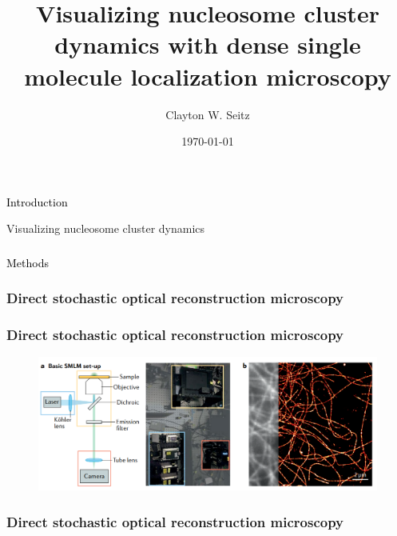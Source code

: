 \documentclass{beamer}					%
\title{Visualizing nucleosome cluster dynamics with dense single molecule localization microscopy}	%
\author{Clayton W. Seitz}								%
\date{\today}									%
\begin{document}
\begin{frame}
  \titlepage
\end{frame}


%


\begin{frame}
\frametitle{}
\centering
\Large \textcolor{black}{Introduction}
\end{frame}

\begin{frame}{Visualizing nucleosome cluster dynamics}

\end{frame}


\begin{frame}
\frametitle{}
\centering
\Large \textcolor{black}{Methods}
\end{frame}



\begin{frame}
\frametitle{Direct stochastic optical reconstruction microscopy}

\end{frame}

\begin{frame}
\frametitle{Direct stochastic optical reconstruction microscopy}

\begin{figure}
\includegraphics[width=\textwidth]{Setup.png}
\end{figure}
  
\end{frame}

\begin{frame}
\frametitle{Direct stochastic optical reconstruction microscopy}

  
\end{frame}
\end{document}
